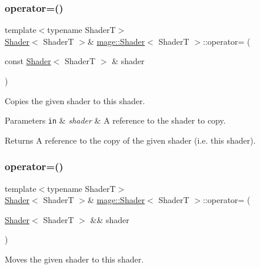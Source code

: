\subsubsection{\texorpdfstring{operator=()}{operator=()}\hspace{0.1cm}{\footnotesize\ttfamily [1/2]}}
{\footnotesize\ttfamily template$<$typename ShaderT$>$ \\
\hyperlink{classmage_1_1_shader}{Shader}$<$ ShaderT $>$\& \hyperlink{classmage_1_1_shader}{mage\+::\+Shader}$<$ ShaderT $>$\+::operator= (\begin{DoxyParamCaption}\item[{const \hyperlink{classmage_1_1_shader}{Shader}$<$ ShaderT $>$ \&}]{shader }\end{DoxyParamCaption})\hspace{0.3cm}{\ttfamily [delete]}}

Copies the given shader to this shader.


\begin{DoxyParams}[1]{Parameters}
\mbox{\tt in}  & {\em shader} & A reference to the shader to copy. \\
\hline
\end{DoxyParams}
\begin{DoxyReturn}{Returns}
A reference to the copy of the given shader (i.\+e. this shader). 
\end{DoxyReturn}
\hypertarget{classmage_1_1_shader_a37920c4d17e560eb3242574837d12c65}{}\label{classmage_1_1_shader_a37920c4d17e560eb3242574837d12c65} 
\subsubsection{\texorpdfstring{operator=()}{operator=()}\hspace{0.1cm}{\footnotesize\ttfamily [2/2]}}
{\footnotesize\ttfamily template$<$typename ShaderT$>$ \\
\hyperlink{classmage_1_1_shader}{Shader}$<$ ShaderT $>$\& \hyperlink{classmage_1_1_shader}{mage\+::\+Shader}$<$ ShaderT $>$\+::operator= (\begin{DoxyParamCaption}\item[{\hyperlink{classmage_1_1_shader}{Shader}$<$ ShaderT $>$ \&\&}]{shader }\end{DoxyParamCaption})\hspace{0.3cm}{\ttfamily [delete]}}

Moves the given shader to this shader.


